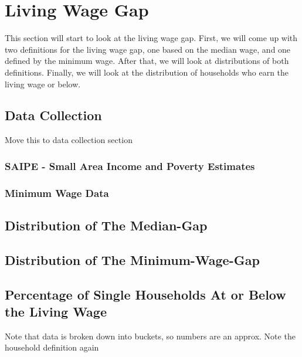 \chapter{Living Wage Gap}\label{ch:living_wage_gap}

This section will start to look at the living wage gap. First, we will come up with two definitions for the living wage gap, one based on the median wage, and one defined by the minimum wage. After that, we will look at distributions of both definitions. Finally, we will look at the distribution of households who earn the living wage or below.

\section{Data Collection}

Move this to data collection section

\subsection{SAIPE - Small Area Income and Poverty Estimates}

\subsection{Minimum Wage Data}


\section{Distribution of The Median-Gap}


\section{Distribution of The Minimum-Wage-Gap}


\section{Percentage of Single Households At or Below the Living Wage}

Note that data is broken down into buckets, so numbers are an approx. Note the household definition again